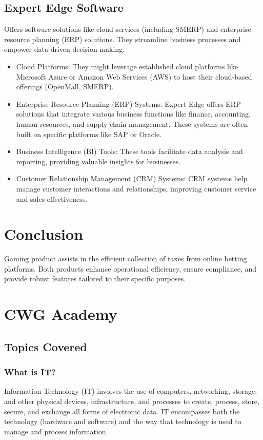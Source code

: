 \documentclass[a4paper,12pt]{report}
\begin{document}
	\subsection{Expert Edge Software}
	Offers software solutions like cloud services (including SMERP) and enterprise resource planning (ERP) solutions. They streamline business processes and empower data-driven decision making.
	
	\begin{itemize}
		\item Cloud Platforms: They might leverage established cloud platforms like Microsoft Azure or Amazon Web Services (AWS) to host their cloud-based offerings (OpenMall, SMERP).
		
		\item Enterprise Resource Planning (ERP) Systems: Expert Edge offers ERP solutions that integrate various business functions like finance, accounting, human resources, and supply chain management. These systems are often built on specific platforms like SAP or Oracle.
		
		\item Business Intelligence (BI) Tools: These tools facilitate data analysis and reporting, providing valuable insights for businesses.
		
		\item Customer Relationship Management (CRM) Systems: CRM systems help manage customer interactions and relationships, improving customer service and sales effectiveness.
		
	\end{itemize}
	
		\section{Conclusion}
	Gaming product assists in the efficient collection of taxes from online betting platforms. Both products enhance operational efficiency, ensure compliance, and provide robust features tailored to their specific purposes.
	
	
	\section{CWG Academy}
	
	\subsection{Topics Covered}
	\subsubsection{What is IT?}
	Information Technology (IT) involves the use of computers, networking, storage, and other physical devices, infrastructure, and processes to create, process, store, secure, and exchange all forms of electronic data. IT encompasses both the technology (hardware and software) and the way that technology is used to manage and process information.
	
\end{document}
